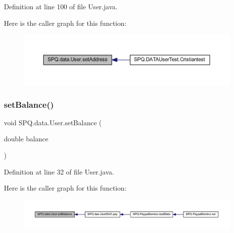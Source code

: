 Definition at line 100 of file User.\+java.

Here is the caller graph for this function\+:\nopagebreak
\begin{figure}[H]
\begin{center}
\leavevmode
\includegraphics[width=350pt]{class_s_p_q_1_1data_1_1_user_ab6e40ae379cda1d98a5873365df30736_icgraph}
\end{center}
\end{figure}
\mbox{\label{class_s_p_q_1_1data_1_1_user_ab9b205d96fa6c53cc3956c2ddcc9c4a7}} 
\subsubsection{\texorpdfstring{set\+Balance()}{setBalance()}}
{\footnotesize\ttfamily void S\+P\+Q.\+data.\+User.\+set\+Balance (\begin{DoxyParamCaption}\item[{double}]{balance }\end{DoxyParamCaption})}



Definition at line 32 of file User.\+java.

Here is the caller graph for this function\+:\nopagebreak
\begin{figure}[H]
\begin{center}
\leavevmode
\includegraphics[width=350pt]{class_s_p_q_1_1data_1_1_user_ab9b205d96fa6c53cc3956c2ddcc9c4a7_icgraph}
\end{center}
\end{figure}
\mbox{\label{class_s_p_q_1_1data_1_1_user_a0fe49415c82bbbbfa0b22822f054157f}} 
